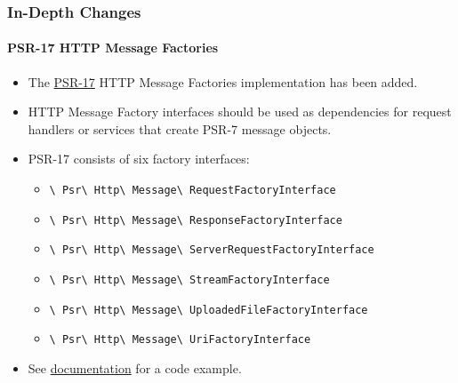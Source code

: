 
\begin{frame}[fragile]
	\frametitle{In-Depth Changes}
	\framesubtitle{PSR-17 HTTP Message Factories}

	\begin{itemize}
		\item The \href{https://www.php-fig.org/psr/psr-17/}{PSR-17}
			HTTP Message Factories implementation has been added.
		\item HTTP Message Factory interfaces should be used as dependencies for
			request handlers or services that create PSR-7 message objects.
		\item PSR-17 consists of six factory interfaces:

			\begin{itemize}\smaller
				\item \texttt{\textbackslash
					Psr\textbackslash
					Http\textbackslash
					Message\textbackslash
					RequestFactoryInterface}
				\item \texttt{\textbackslash
					Psr\textbackslash
					Http\textbackslash
					Message\textbackslash
					ResponseFactoryInterface}
				\item \texttt{\textbackslash
					Psr\textbackslash
					Http\textbackslash
					Message\textbackslash
					ServerRequestFactoryInterface}
				\item \texttt{\textbackslash
					Psr\textbackslash
					Http\textbackslash
					Message\textbackslash
					StreamFactoryInterface}
				\item \texttt{\textbackslash
					Psr\textbackslash
					Http\textbackslash
					Message\textbackslash
					UploadedFileFactoryInterface}
				\item \texttt{\textbackslash
					Psr\textbackslash
					Http\textbackslash
					Message\textbackslash
					UriFactoryInterface}

			\end{itemize}\normalsize

		\item See
			\href{https://docs.typo3.org/c/typo3/cms-core/master/en-us/Changelog/10.1/Feature-89018-ProvideImplementationForPSR-17HTTPMessageFactories.html}{documentation}
			for a code example.

	\end{itemize}

\end{frame}

